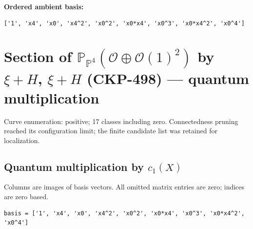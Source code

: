 \documentclass[10pt,a4paper]{article}
\begin{document}
\textbf{Ordered ambient basis:}
\begin{lstlisting}
['1', 'x4', 'x0', 'x4^2', 'x0^2', 'x0*x4', 'x0^3', 'x0*x4^2', 'x0^4']
\end{lstlisting}

\clearpage\section*{Section of $\mathbb P_{\mathbb P^{4}}(\mathcal O\oplus \mathcal O(1)^{2})$ by $\xi +H$, $\xi +H$ (CKP-498) --- quantum multiplication}

Curve enumeration: positive; 17 classes including zero.
Connectedness pruning reached its configuration limit; the finite candidate list was retained for localization.
\subsection*{Quantum multiplication by $c_1(X)$}
Columns are images of basis vectors. All omitted matrix entries are zero; indices are zero based.

\begin{lstlisting}
basis = ['1', 'x4', 'x0', 'x4^2', 'x0^2', 'x0*x4', 'x0^3', 'x0*x4^2', 'x0^4']
\end{lstlisting}
\end{document}
